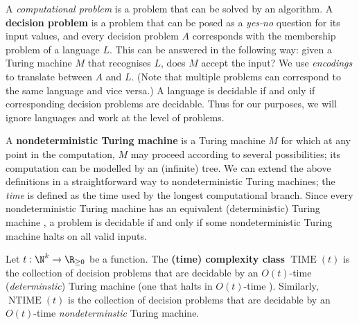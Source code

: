 A \textit{computational problem} is a problem that can be solved by an algorithm. A \textbf{decision problem} is a problem that can be posed as a \textit{yes-no} question for its input values, and every decision problem $A$ corresponds with the membership problem of a language $L$. This can be answered in the following way: given a Turing machine $M$ that recognises $L$, does $M$ accept the input? We use \textit{encodings} to translate between $A$ and $L$. (Note that multiple problems can correspond to the same language and vice versa.) A language is decidable if and only if corresponding decision problems are decidable. Thus for our purposes, we will ignore languages and work at the level of problems.

A \textbf{nondeterministic Turing machine} is a Turing machine $M$ for which at any point in the computation, $M$ may proceed according to several possibilities; its computation can be modelled by an (infinite) tree. We can extend the above definitions in a straightforward way to nondeterministic Turing machines; the \textit{time}  is defined  as the time used by the longest computational branch. Since every nondeterministic Turing machine has an equivalent (deterministic) Turing machine , a problem is decidable if and only if some nondeterministic Turing machine halts on all valid inputs.

\begin{definition}\label{def:time_complexity_class}
  Let $t : \N^k \to \R_{\geq 0}$ be a function. The \textbf{(time) complexity class} $\operatorname{TIME}(t)$ is the collection of decision problems that are decidable by an $O(t)$-time (\textit{determinstic}) Turing machine (one that halts in $O(t)$-time ). Similarly, $\operatorname{NTIME}(t)$ is the collection of decision problems that are decidable by an $O(t)$-time \textit{nondeterminstic} Turing machine.

\end{definition}

